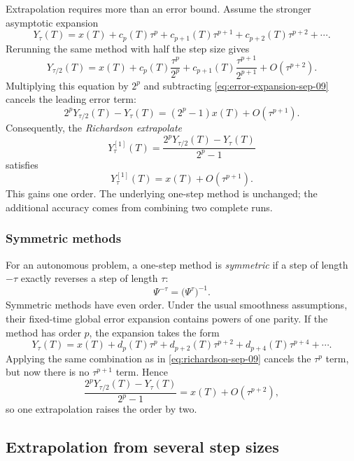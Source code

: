 Extrapolation requires more than an error bound. Assume the stronger
asymptotic expansion
\begin{equation}\label{eq:error-expansion-sep-09}
  Y_\tau(T)
  =x(T)+c_p(T)\tau^p+c_{p+1}(T)\tau^{p+1}
   +c_{p+2}(T)\tau^{p+2}+\cdots.
\end{equation}
Rerunning the same method with half the step size gives
\[
  Y_{\tau/2}(T)
  =x(T)+c_p(T)\frac{\tau^p}{2^p}
   +c_{p+1}(T)\frac{\tau^{p+1}}{2^{p+1}}
   +O(\tau^{p+2}).
\]
Multiplying this equation by \(2^p\) and subtracting
\eqref{eq:error-expansion-sep-09} cancels the leading error term:
\[
  2^pY_{\tau/2}(T)-Y_\tau(T)
  =(2^p-1)x(T)+O(\tau^{p+1}).
\]
Consequently, the \emph{Richardson extrapolate}
\begin{equation}\label{eq:richardson-sep-09}
  Y^{[1]}_\tau(T)
  =\frac{2^pY_{\tau/2}(T)-Y_\tau(T)}{2^p-1}
\end{equation}
satisfies
\[
  Y^{[1]}_\tau(T)=x(T)+O(\tau^{p+1}).
\]
This gains one order. The underlying one-step method is unchanged; the
additional accuracy comes from combining two complete runs.

\subsubsection{Symmetric methods}

For an autonomous problem, a one-step method is \emph{symmetric} if a
step of length \(-\tau\) exactly reverses a step of length \(\tau\):
\[
  \Psi^{-\tau}=\bigl(\Psi^\tau\bigr)^{-1}.
\]
Symmetric methods have even order. Under the usual smoothness
assumptions, their fixed-time global error expansion contains powers
of one parity. If the method has order \(p\), the expansion takes the
form
\begin{equation}\label{eq:symmetric-expansion-sep-09}
  Y_\tau(T)
  =x(T)+d_p(T)\tau^p+d_{p+2}(T)\tau^{p+2}
   +d_{p+4}(T)\tau^{p+4}+\cdots.
\end{equation}
Applying the same combination as in \eqref{eq:richardson-sep-09}
cancels the \(\tau^p\) term, but now there is no
\(\tau^{p+1}\) term. Hence
\[
  \frac{2^pY_{\tau/2}(T)-Y_\tau(T)}{2^p-1}
  =x(T)+O(\tau^{p+2}),
\]
so one extrapolation raises the order by two.

\subsection{Extrapolation from several step sizes}

